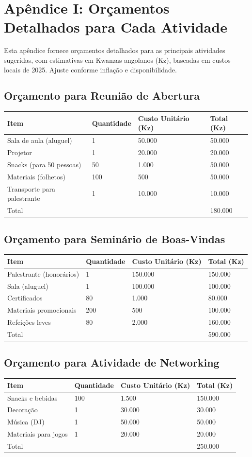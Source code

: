 \documentclass[12pt]{article}
\begin{document}
\section{Apêndice I: Orçamentos Detalhados para Cada Atividade}

Esta apêndice fornece orçamentos detalhados para as principais atividades sugeridas, com estimativas em Kwanzas angolanos (Kz), baseadas em custos locais de 2025. Ajuste conforme inflação e disponibilidade.

\subsection{Orçamento para Reunião de Abertura}
\begin{longtable}{|l|l|l|l|}
\hline
Item & Quantidade & Custo Unitário (Kz) & Total (Kz) \\
\hline
Sala de aula (aluguel) & 1 & 50.000 & 50.000 \\
Projetor & 1 & 20.000 & 20.000 \\
Snacks (para 50 pessoas) & 50 & 1.000 & 50.000 \\
Materiais (folhetos) & 100 & 500 & 50.000 \\
Transporte para palestrante & 1 & 10.000 & 10.000 \\
\hline
Total & & & 180.000 \\
\hline
\end{longtable}

\subsection{Orçamento para Seminário de Boas-Vindas}
\begin{longtable}{|l|l|l|l|}
\hline
Item & Quantidade & Custo Unitário (Kz) & Total (Kz) \\
\hline
Palestrante (honorários) & 1 & 150.000 & 150.000 \\
Sala (aluguel) & 1 & 100.000 & 100.000 \\
Certificados & 80 & 1.000 & 80.000 \\
Materiais promocionais & 200 & 500 & 100.000 \\
Refeições leves & 80 & 2.000 & 160.000 \\
\hline
Total & & & 590.000 \\
\hline
\end{longtable}

\subsection{Orçamento para Atividade de Networking}
\begin{longtable}{|l|l|l|l|}
\hline
Item & Quantidade & Custo Unitário (Kz) & Total (Kz) \\
\hline
Snacks e bebidas & 100 & 1.500 & 150.000 \\
Decoração & 1 & 30.000 & 30.000 \\
Música (DJ) & 1 & 50.000 & 50.000 \\
Materiais para jogos & 1 & 20.000 & 20.000 \\
\hline
Total & & & 250.000 \\
\hline
\end{longtable}
\end{document}
